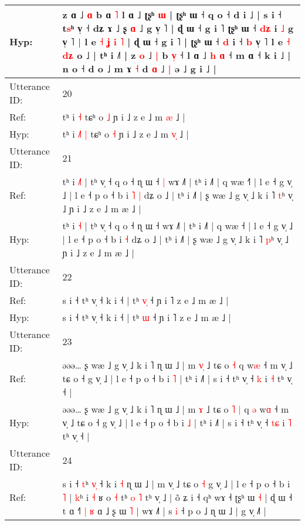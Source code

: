 \documentclass[10pt]{article}
\DeclareRobustCommand{\hl}[1]{{\textcolor{red}{#1}}}
\begin{document}
\begin{longtable}{ll}
 \\
Hyp: & z ɑ ˩\hl{ }\hl{ɑ} b ɑ \hl{˥} l ɑ ˩ ʈʂʰ\hl{ }\hl{ɯ} | ʈʂʰ ɯ ˧ q o ˧ d i ˩ | s i ˧ t\hl{s}ʰ v̩ ˧\hl{}\hl{} dʑ ɤ ˩\hl{}\hl{}\hl{}\hl{}\hl{}\hl{}\hl{}\hl{}\hl{} ʂ \hl{}\hl{ɑ} ˩ g v̩ \hl{}˥\hl{}\hl{}\hl{}\hl{}\hl{}\hl{}\hl{}\hl{}\hl{} | ɖ ɯ ˧ g i ˥\hl{}\hl{} ʈʂʰ ɯ ˧ \hl{d}\hl{ʑ} i \hl{˩} g v̩ ˥\hl{ }\hl{|} l e \hl{˧} \hl{ʝ}\hl{ }\hl{i} \hl{˥} | ɖ ɯ ˧ g i ˥ | ʈʂʰ ɯ ˧ \hl{d} i ˧ \hl{b} v̩ ˥ l e \hl{˧} \hl{d}\hl{ʑ}\hl{ }o ˩ | tʰ i ˩˥ | z \hl{o} ˩\hl{ }\hl{|} b \hl{v}\hl{̩} ˧ l ɑ ˩ \hl{h} \hl{ɑ} ˧ m ɑ ˧ k i ˩ | n o ˧\hl{}\hl{} d o ˩ m ɤ \hl{˧} d \hl{ɑ} ˩\hl{ }\hl{|} ə ˩ g i ˩ |
 \\
\midrule
Utterance ID: & 20 \\
Ref: & tʰ i\hl{}\hl{}\hl{} \hl{˧} tɕʰ o \hl{˩} ɲ i ˩ z e ˩ m \hl{}\hl{æ} ˩ |
 \\
Hyp: & tʰ i\hl{ }\hl{˩}\hl{˥} \hl{|} tɕʰ o \hl{˧} ɲ i ˩ z e ˩ m \hl{v}\hl{̩} ˩ |
 \\
\midrule
Utterance ID: & 21 \\
Ref: & tʰ i \hl{˩}\hl{˥} | tʰ v̩ ˧ q o ˧ ɳ ɯ ˧\hl{ }\hl{|} wɤ ˩˥ | tʰ i ˩˥ | q wæ ˧\hl{˥} | l e ˧ g v̩ ˩ | l e ˧ p o ˧ b i\hl{ }\hl{˥} \hl{|} dʑ o ˩ | tʰ i ˩˥ | ʂ wæ ˩ g v̩ ˩ k i ˥ \hl{t}ʰ v̩ ˩ ɲ i ˩ z e ˩ m æ ˩ |
 \\
Hyp: & tʰ i \hl{}\hl{˧} | tʰ v̩ ˧ q o ˧ ɳ ɯ ˧\hl{}\hl{} wɤ ˩˥ | tʰ i ˩˥ | q wæ ˧\hl{} | l e ˧ g v̩ ˩ | l e ˧ p o ˧ b i\hl{}\hl{} \hl{˧} dʑ o ˩ | tʰ i ˩˥ | ʂ wæ ˩ g v̩ ˩ k i ˥ \hl{p}ʰ v̩ ˩ ɲ i ˩ z e ˩ m æ ˩ |
 \\
\midrule
Utterance ID: & 22 \\
Ref: & s i ˧ tʰ v̩ ˧ k i ˧ | tʰ \hl{v}\hl{̩} ˧ ɲ i ˥ z e ˩ m æ ˩ |
 \\
Hyp: & s i ˧ tʰ v̩ ˧ k i ˧ | tʰ \hl{}\hl{ɯ} ˧ ɲ i ˥ z e ˩ m æ ˩ |
 \\
\midrule
Utterance ID: & 23 \\
Ref: & əəə… ʂ wæ ˩ g v̩ ˩ k i ˥ ɳ ɯ ˩ | m \hl{v}\hl{̩} ˩ tɕ o\hl{}\hl{} \hl{˧} q\hl{}\hl{} w\hl{æ} ˧ m v̩ ˩ tɕ o ˧ g v̩ ˩ | l e ˧ p o ˧ b i \hl{˥} | tʰ i ˩˥ | s i ˧ tʰ v̩ ˧ \hl{}\hl{k} i \hl{˧} tʰ v̩ ˧ |
 \\
Hyp: & əəə… ʂ wæ ˩ g v̩ ˩ k i ˥ ɳ ɯ ˩ | m \hl{}\hl{ɤ} ˩ tɕ o\hl{ }\hl{˥} \hl{|} q\hl{ }\hl{ə} w\hl{ɑ} ˧ m v̩ ˩ tɕ o ˧ g v̩ ˩ | l e ˧ p o ˧ b i \hl{˩} | tʰ i ˩˥ | s i ˧ tʰ v̩ ˧ \hl{t}\hl{ɕ} i \hl{˥} tʰ v̩ ˧ |
 \\
\midrule
Utterance ID: & 24 \\
Ref: & s i ˧ \hl{}\hl{t}ʰ \hl{v}\hl{̩} ˧ k\hl{} i \hl{˧} ɳ ɯ ˩ | m v̩ ˩ tɕ o \hl{˧} g v̩ ˩ | l e ˧ p o ˧ b i \hl{˥} | \hl{}\hl{k}ʰ i \hl{˧} ʁ o \hl{˧} tʰ \hl{}\hl{o} \hl{˥} tʰ v̩ ˩ | õ ʑ i ˧ qʰ wɤ ˧ ʈʂʰ ɯ \hl{˧} | ɖ ɯ ˧ t ɑ ˧˥\hl{ }\hl{|}\hl{ }\hl{ʁ} ɑ ˩ ʂ ɯ \hl{˥} | wɤ ˩˥ | s \hl{i} ˧ p o ˩ ɳ ɯ ˩ | g v̩ ˩˥ |

\end{longtable}
\end{document}
